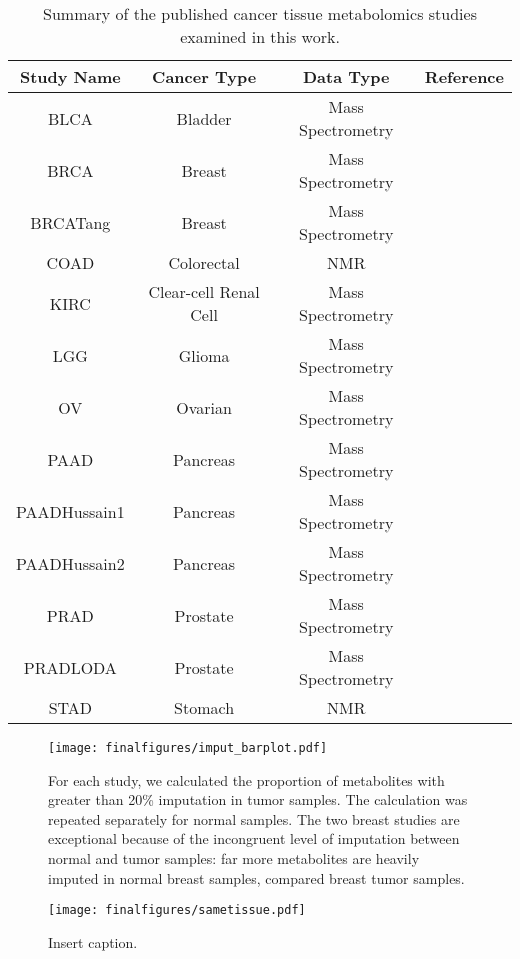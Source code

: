 \documentclass[10pt]{article}
\begin{document}
\begin{table}
\centering
\begin{tabular}{ c c c c }
  \textbf{Study Name} & \textbf{Cancer Type} & Data Type & \textbf{Reference}  \\
  \hline
  BLCA & Bladder & Mass Spectrometry & \cite{Putluri2011} \\
  BRCA & Breast & Mass Spectrometry & \cite{Terunuma2014} \\
  BRCATang & Breast & Mass Spectrometry & \cite{Tang2014} \\
  COAD & Colorectal & NMR & \cite{Hirayama2009} \\
  KIRC & Clear-cell Renal Cell & Mass Spectrometry & \cite{Hakimi2015} \\
  LGG & Glioma & Mass Spectrometry & \cite{Chinnaiyan2012} \\
  OV & Ovarian & Mass Spectrometry & \cite{Fong2011} \\
  PAAD & Pancreas & Mass Spectrometry & \cite{Kamphorst2015} \\
  PAADHussain1 & Pancreas & Mass Spectrometry & \cite{Zhang2013} \\
  PAADHussain2 & Pancreas & Mass Spectrometry & \cite{Zhang2013} \\
  PRAD & Prostate & Mass Spectrometry & \cite{Sreekumar2009} \\
  PRADLODA & Prostate & Mass Spectrometry & \cite{Priolo2014} \\
  STAD & Stomach & NMR & \cite{Hirayama2009}
\end{tabular}
\caption{Summary of the published cancer tissue metabolomics studies examined in this work.}
\label{table:SITab_Studies}
\end{table}

\begin{figure}[ht!]
  \centering
     \texttt{[image: finalfigures/imput\_barplot.pdf]}
  \caption{For each study, we calculated the proportion of metabolites with greater than 20\% imputation in tumor samples. The calculation was repeated separately for normal samples. The two breast studies are exceptional because of the incongruent level of imputation between normal and tumor samples: far more metabolites are heavily imputed in normal breast samples, compared breast tumor samples. }
     \label{fig:SIFig_Imputation}
\end{figure}

\begin{figure}[ht!]
  \centering
     \texttt{[image: finalfigures/sametissue.pdf]}
  \caption{Insert caption.}
     \label{fig:SIFig_SameTissue}
\end{figure}
\end{document}
